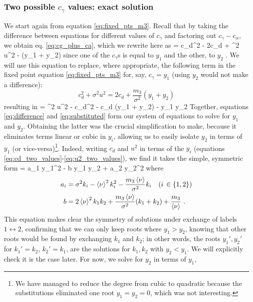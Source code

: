 \subsubsection{Two possible $c_{\gamma}$ values: exact solution}
We start again from equation \eqref{eq:fixed_pts_m3}. Recall that by taking the difference between equations for different values of $c_{\gamma}$ and factoring out $c_{\gamma} - c_{\alpha}$, we obtain eq. \eqref{eq:cg_plus_ca}, which we rewrite here as
 = c_d^2 - 2c_d + \sigma^2 u^2 - (y_1 + y_2)
	\label{eq:difference}
\eeq
since one of the $c_{\gamma}$s is equal to $y_1$ and the other, to $y_2$ . We will use this equation to replace, where appropriate, the following term in the fixed point equation \eqref{eq:fixed_pts_m3} for, say, $c_{\gamma} = y_1$ (using $y_2$ would not make a difference):
\begin{equation*}
c_d^2 + \sigma^2 u^2 = 2 c_d + \frac{m_3}{\sigma^2}(y_1 + y_2)
\end{equation*}
resulting in
 = \sigma^2 u^2 - c_d^2 -  c_d (y_1 + y_2) -  y_1 y_2
	\label{eq:substituted}
\eeq
Together, equations \eqref{eq:difference} and \eqref{eq:substituted} form our system of equations to solve for $y_1$ and $y_2$. Obtaining the latter was the crucial simplification to make, because it eliminates terms linear or cubic in $y_i$, allowing us to easily isolate $y_2$ in terms of $y_1$ (or vice-versa){\protect\footnote{
We have managed to reduce the degree from cubic to quadratic because the substitutions eliminated one root $y_1 = y_2 = 0$, which was not interesting. 
}}. Indeed, writing $c_d$ and $u^2$ in terms of the $y_i$ (equations \ref{eq:cd_two_values}-\ref{eq:u2_two_values}), we find it takes the simple, symmetric form
 = a_1 y_1^2 - b y_1 y_2 + a_2 y_2^2
\label{eq:quadratic}
\eeq
where
\begin{align}
	a_i &= \sigma^2 k_i - \braket{\nu}^2 k_i^2 - \frac{m_3 \braket{\nu}}{\sigma^2} k_i  \quad (i \, \in \{1, 2\})  \nonumber \\
	b &= 2 \braket{\nu}^2 k_1 k_2  + \frac{m_3 \braket{\nu}}{\sigma^2}(k_1 + k_2) + \frac{m_3}{\braket{\nu}} \,\, .		\label{eq:quadratic_coefs}
\end{align}
This equation makes clear the symmetry of solutions under exchange of labels $1 \leftrightarrow 2$, confirming that we can only keep roots where $y_1 > y_2$, knowing that other roots would be found by exchanging $k_1$ and $k_2$; in other words, the roots $y_1', y_2'$ for $k_1' = k_2$, $k_2' = k_1$, are the solutions for $k_1, k_2$ with $y_2 < y_1$. We will explicitly check it is the case later. For now, we solve for $y_2$ in terms of $y_1$,
